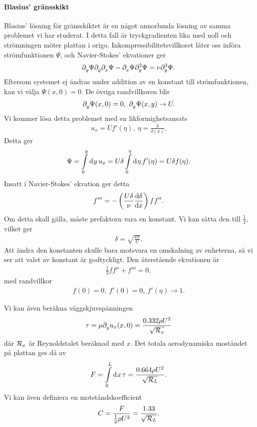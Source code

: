 \paragraph{Blasius' gränsskikt}
Blasius' lösning för gränsskiktet är en något annorlunda lösning av samma problemet vi har studerat. I detta fall är tryckgradienten lika med noll och strömningen möter plattan i origo. Inkompressibilitetsvillkoret låter oss införa strömfunktionen $\Psi$, och Navier-Stokes' ekvationer ger
\begin{align*}
	\del{y}{\Psi}\del{y}{\del{x}{\Psi}} - \del{x}{\Psi}\del[2]{y}{\Psi} = \nu\del[3]{y}{\Psi}.
\end{align*}
Eftersom systemet ej ändras under addition av en konstant till strömfunktionen, kan vi välja $\Psi(x, 0) = 0$. De övriga randvillkoren blir
\begin{align*}
	\del{y}{\Psi}(x, 0) = 0,\ \del{y}{\Psi}(x, y) \to U.
\end{align*}
Vi kommer lösa detta problemet med en likformighetsansats
\begin{align*}
	u_{x} = Uf'(\eta),\ \eta = \frac{y}{\delta(x)}.
\end{align*}
Detta ger
\begin{align*}
	\Psi = \integ{0}{y}{y}{u_{x}} = U\delta\integ{0}{\eta}{\eta}{f'(\eta)} = U\delta f(\eta).
\end{align*}
Insatt i Navier-Stokes' ekvation ger detta
\begin{align*}
	f''' = -\left(\frac{U\delta}{\nu}\dv{\delta}{x}\right)ff''.
\end{align*}
Om detta skall gälla, måste prefaktorn vara en konstant. Vi kan sätta den till $\frac{1}{2}$, vilket ger
\begin{align*}
	\delta = \sqrt{\frac{\nu x}{U}}.
\end{align*}
Att ändra den konstanten skulle bara motsvara en omskalning av enheterna, så vi ser att valet av konstant är godtyckligt. Den återstående ekvationen är
\begin{align*}
	\frac{1}{2}ff'' + f''' = 0,
\end{align*}
med randvillkor
\begin{align*}
	f(0) = 0,\ f'(0) = 0,\ f'(\eta) \to 1.
\end{align*}

Vi kan även beräkna väggskjuvspänningen
\begin{align*}
	\tau = \mu\del{y}{u_{x}}(x, 0) = \frac{0.332\rho U^{2}}{\sqrt{\rey_{x}}}
\end{align*}
där $\rey_{x}$ är Reynoldstalet beräknad med $x$. Det totala aerodynamiska moståndet på plattan ges då av
\begin{align*}
	F = \integ{0}{L}{x}{\tau} = \frac{0.664\rho U^{2}}{\sqrt{\rey_{L}}}.
\end{align*}
Vi kan även definiera en motståndskoefficient
\begin{align*}
	C = \frac{F}{\frac{1}{2}\rho U^{2}} = \frac{1.33}{\sqrt{\rey_{L}}}.
\end{align*}